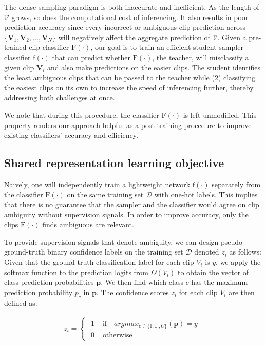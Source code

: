 \documentclass[a4paper,conference]{IEEEtran}
\begin{document}
The dense sampling paradigm is both inaccurate and inefficient. As the length of $\mathcal{V}$ grows, so does the computational cost of inferencing. It also results in poor prediction accuracy since every incorrect or ambiguous clip prediction across $\{\mathbf{V}_1, \mathbf{V}_2, \ldots, \mathbf{V}_N\}$  will negatively affect the aggregate prediction of $\mathcal{V}$. Given a pre-trained clip classifier $\mathrm{F}(\cdot)$, our goal is to train an efficient student sampler-classifier $\mathrm{f}(\cdot)$ that can predict whether $\mathrm{F}(\cdot)$, the teacher, will misclassify a given clip $\mathbf{V}_i$ and also make predictions on the easier clips. The student identifies the least ambiguous clips that can be passed to the teacher while (2) classifying the easiest clips on its own to increase the speed of inferencing further, thereby addressing both challenges at once. 

We note that during this procedure, the classifier $\mathrm{F}(\cdot)$ is left unmodified. This property renders our approach helpful as a post-training procedure to improve existing classifiers' accuracy and efficiency.

\subsection{Shared representation learning objective}
\label{motivation}

Naively, one will independently train a lightweight network $\mathrm{f}(\cdot)$ separately from the classifier $\mathrm{F}(\cdot)$ on the same training set $\mathcal{D}$ with one-hot labels. This implies that there is no guarantee that the sampler and the classifier would agree on clip ambiguity without supervision signals. In order to improve accuracy, only the clips $\mathrm{F}(\cdot)$ finds ambiguous are relevant. 

To provide supervision signals that denote ambiguity, we can design pseudo-ground-truth binary confidence labels on the training set $\mathcal{D}$ denoted  $z_i$ as follows: Given that the ground-truth classification label for each clip $V_i$ is $y$, we apply the softmax function to the prediction logits from $\Omega(V_i)$ to obtain the vector of class prediction probabilities $\mathbf{p}$. We then find which class $c$ has the maximum prediction probability $p_c$ in $\mathbf{p}$. The confidence scores $z_i$ for each clip $V_i$ are then defined as:

\begin{eqnarray}
z_i = \begin{cases} 
\begin{array}{cl}
1 & \text{ if~~ } argmax_{c \in \{1,\dots,C\}}(\mathbf{p}) = y\\
0 & \text{ otherwise}
\end{array}
\end{cases}
\label{psuedolabels}
\end{eqnarray}
\end{document}
